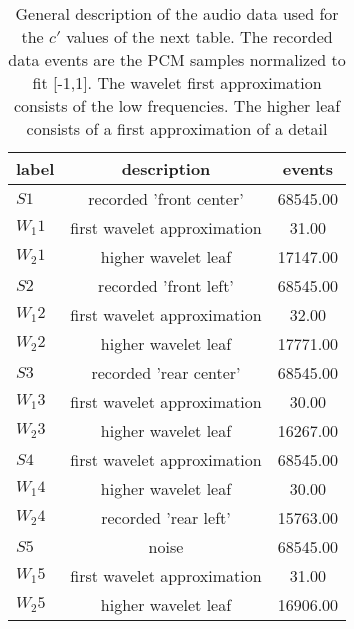 \begin{table}[h!]
\begin{center}
\begin{tabular}{| l | c | c |}\hline
label & description & events \\\hline
$S1$ & recorded 'front center'  & 68545.00 \\\hline
$W_1 1$ & first wavelet approximation  & 31.00 \\\hline
$W_2 1$ & higher wavelet leaf  & 17147.00 \\\hline
$S2$ & recorded 'front left'  & 68545.00 \\\hline
$W_1 2$ & first wavelet approximation  & 32.00 \\\hline
$W_2 2$ & higher wavelet leaf  & 17771.00 \\\hline
$S3$ & recorded 'rear center'  & 68545.00 \\\hline
$W_1 3$ & first wavelet approximation  & 30.00 \\\hline
$W_2 3$ & higher wavelet leaf  & 16267.00 \\\hline
$S4$ & first wavelet approximation  & 68545.00 \\\hline
$W_1 4$ & higher wavelet leaf  & 30.00 \\\hline
$W_2 4$ & recorded 'rear left'  & 15763.00 \\\hline
$S5$ & noise  & 68545.00 \\\hline
$W_1 5$ & first wavelet approximation  & 31.00 \\\hline
$W_2 5$ & higher wavelet leaf  & 16906.00 \\\hline
\end{tabular}
\caption{General description of the audio data used for the $c'$ values of the next table. The recorded data events are the PCM samples normalized to fit [-1,1]. The wavelet first approximation consists of the low frequencies. The higher leaf consists of a first approximation of a detail}
\end{center}
\end{table}